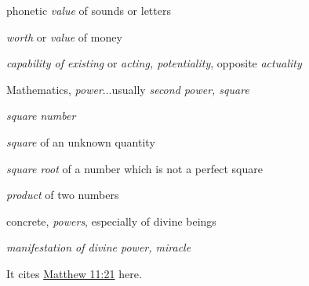 \begin{compactdesc}
\begin{compactitem}
							\item[III.1.b] phonetic \textit{value} of sounds or letters
							\item[III.2] \textit{worth} or \textit{value} of money
							\item[IV] \textit{capability of existing} or \textit{acting, potentiality}, opposite \textit{actuality}
							\item[V.1.a] Mathematics, \textit{power}...usually \textit{second power, square}
							\item[V.1.b] \textit{square number} 
							\item[V.1.c] \textit{square} of an unknown quantity
							\item[V.2] \textit{square root} of a number which is not a perfect square
							\item[V.3] \textit{product} of two numbers
							\item[VI] concrete, \textit{powers}, especially of divine beings
							\item[VII] \textit{manifestation of divine power, miracle}
								\begin{compactitem}
									\item It cites \hyperref[MATTHEW-11-21]{Matthew 11:21} here.
								\end{compactitem}
						\end{compactitem}
				\end{compactdesc}
				
				
				\begin{compactdesc}
					\item[Some NT uses] \textbf{}
						\begin{compactdesc}
							\item[{\hyperref[MARK-5-30]{Mark 5:30}}]
							\item[{\hyperref[LUKE-8-46]{Luke 8:46}}]
						\end{compactdesc}
				\end{compactdesc}
				
		
	
